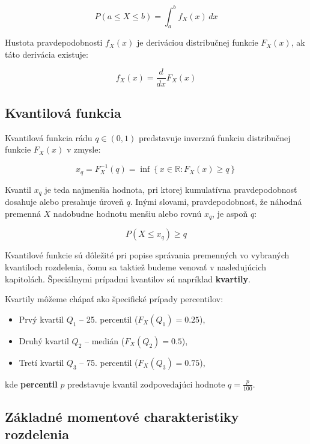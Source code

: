 \begin{equation}
P(a \leq X \leq b) = \int_{a}^{b} f_X(x) \, dx 
\end{equation}

Hustota pravdepodobnosti $f_X(x)$ je deriváciou distribučnej funkcie $F_X(x)$, ak táto derivácia existuje: 

\begin{equation} 
f_X(x) = \frac{d}{dx} F_X(x) 
\end{equation}

\subsection{Kvantilová funkcia}

Kvantilová funkcia rádu $q \in (0, 1)$ predstavuje inverznú funkciu distribučnej funkcie $F_X(x)$ v zmysle:

\begin{equation}
x_q = F_X^{-1}(q) = \inf \left\{ x \in \mathbb{R} : F_X(x) \geq q \right\}
\end{equation}

Kvantil $x_q$ je teda najmenšia hodnota, pri ktorej kumulatívna pravdepodobnosť dosahuje alebo presahuje úroveň $q$. Inými slovami, pravdepodobnosť, že náhodná premenná $X$ nadobudne hodnotu menšiu alebo rovnú $x_q$, je aspoň $q$:

\begin{equation}
P(X \leq x_q) \geq q
\end{equation}

Kvantilové funkcie sú dôležité pri popise správania premenných vo vybraných kvantiloch rozdelenia, čomu sa taktiež budeme venovať v nasledujúcich kapitolách. Špeciálnymi prípadmi kvantilov sú napríklad \textbf{kvartily}.

Kvartily môžeme chápať ako špecifické prípady percentilov:
\begin{itemize}
  \item Prvý kvartil $Q_1$ – 25. percentil ($F_X(Q_1) = 0.25$),
  \item Druhý kvartil $Q_2$ – medián ($F_X(Q_2) = 0.5$),
  \item Tretí kvartil $Q_3$ – 75. percentil ($F_X(Q_3) = 0.75$),
\end{itemize}

kde \textbf{percentil} $p$ predstavuje kvantil zodpovedajúci hodnote $q = \frac{p}{100}$. \\

\subsection{Základné momentové charakteristiky rozdelenia}

